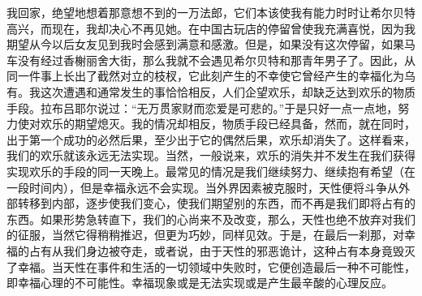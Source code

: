 \par 我回家，绝望地想着那意想不到的一万法郎，它们本该使我有能力时时让希尔贝特高兴，而现在，我却决心不再见她。在中国古玩店的停留曾使我充满喜悦，因为我期望从今以后女友见到我时会感到满意和感激。但是，如果没有这次停留，如果马车没有经过香榭丽舍大街，那么我就不会遇见希尔贝特和那青年男子了。因此，从同一件事上长出了截然对立的枝杈，它此刻产生的不幸使它曾经产生的幸福化为乌有。我这次遭遇和通常发生的事恰恰相反，人们企望欢乐，却缺乏达到欢乐的物质手段。拉布吕耶尔说过：“无万贯家财而恋爱是可悲的。”于是只好一点一点地，努力使对欢乐的期望熄灭。我的情况却相反，物质手段已经具备，然而，就在同时，出于第一个成功的必然后果，至少出于它的偶然后果，欢乐却消失了。这样看来，我们的欢乐就该永远无法实现。当然，一般说来，欢乐的消失并不发生在我们获得实现欢乐的手段的同一天晚上。最常见的情况是我们继续努力、继续抱有希望（在一段时间内），但是幸福永远不会实现。当外界因素被克服时，天性便将斗争从外部转移到内部，逐步使我们变心，使我们期望别的东西，而不再是我们即将占有的东西。如果形势急转直下，我们的心尚来不及改变，那么，天性也绝不放弃对我们的征服，当然它得稍稍推迟，但更为巧妙，同样见效。于是，在最后一刹那，对幸福的占有从我们身边被夺走，或者说，由于天性的邪恶诡计，这种占有本身竟毁灭了幸福。当天性在事件和生活的一切领域中失败时，它便创造最后一种不可能性，即幸福心理的不可能性。幸福现象或是无法实现或是产生最辛酸的心理反应。
